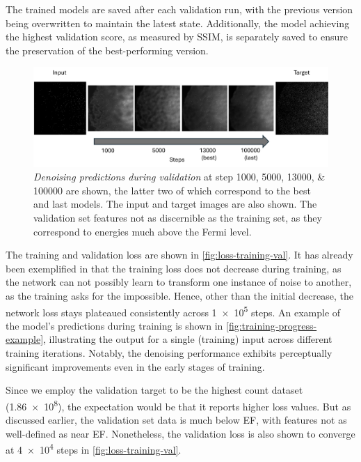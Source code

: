The trained models are saved after each validation run, with the previous version being overwritten to maintain the latest state. Additionally, the model achieving the highest validation score, as measured by \gls{SSIM}, is separately saved to ensure the preservation of the best-performing version.

\begin{figure}
    \centering
    \includegraphics[width=1\linewidth]{images/val_over_time.pdf}
    \caption{\textit{Denoising predictions during validation} at step \numlist{1000;5000;13000;100000} are shown, the latter two of which correspond to the best and last models. The input and target images are also shown. The validation set features not as discernible as the training set, as they correspond to energies much above the Fermi level.}
    \label{fig:val-progress-example}
\end{figure}

The training and validation loss are shown in \cref{fig:loss-training-val}. It has already been exemplified in \cite{lehtinenNoise2NoiseLearningImage2018} that the training loss does not decrease during training, as the network can not possibly learn to transform one instance of noise to another, as the training asks for the impossible. Hence, other than the initial decrease, the network loss stays plateaued consistently across \num{1e5} steps. An example of the model’s predictions during training is shown in \cref{fig:training-progress-example}, illustrating the output for a single (training) input across different training iterations. Notably, the denoising performance exhibits perceptually significant improvements even in the early stages of training.

Since we employ the validation target to be the highest count dataset (\num{1.86e8}), the expectation would be that it reports higher loss values. But as discussed earlier, the validation set data is much below \gls{EF}, with features not as well-defined as near \gls{EF}. Nonetheless, the validation loss is also shown to converge at \num{4e4} steps in \cref{fig:loss-training-val}.

